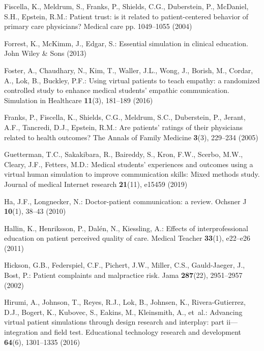 \documentclass[runningheads]{llncs}
\begin{document}
\begin{thebibliography}{10}
Fiscella, K., Meldrum, S., Franks, P., Shields, C.G., Duberstein, P., McDaniel,
  S.H., Epstein, R.M.: Patient trust: is it related to patient-centered
  behavior of primary care physicians? Medical care pp. 1049--1055 (2004)

Forrest, K., McKimm, J., Edgar, S.: Essential simulation in clinical education.
  John Wiley \& Sons (2013)

Foster, A., Chaudhary, N., Kim, T., Waller, J.L., Wong, J., Borish, M., Cordar,
  A., Lok, B., Buckley, P.F.: Using virtual patients to teach empathy: a
  randomized controlled study to enhance medical students’ empathic
  communication. Simulation in Healthcare  \textbf{11}(3),  181--189 (2016)

Franks, P., Fiscella, K., Shields, C.G., Meldrum, S.C., Duberstein, P., Jerant,
  A.F., Tancredi, D.J., Epstein, R.M.: Are patients’ ratings of their
  physicians related to health outcomes? The Annals of Family Medicine
  \textbf{3}(3),  229--234 (2005)

Guetterman, T.C., Sakakibara, R., Baireddy, S., Kron, F.W., Scerbo, M.W.,
  Cleary, J.F., Fetters, M.D.: Medical students’ experiences and outcomes
  using a virtual human simulation to improve communication skills: Mixed
  methods study. Journal of medical Internet research  \textbf{21}(11),  e15459
  (2019)

Ha, J.F., Longnecker, N.: {{D}octor-patient communication: a review}. Ochsner J
   \textbf{10}(1),  38--43 (2010)

Hallin, K., Henriksson, P., Dal{\'e}n, N., Kiessling, A.: Effects of
  interprofessional education on patient perceived quality of care. Medical
  Teacher  \textbf{33}(1),  e22--e26 (2011)

Hickson, G.B., Federspiel, C.F., Pichert, J.W., Miller, C.S., Gauld-Jaeger, J.,
  Bost, P.: Patient complaints and malpractice risk. Jama  \textbf{287}(22),
  2951--2957 (2002)

Hirumi, A., Johnson, T., Reyes, R.J., Lok, B., Johnsen, K., Rivera-Gutierrez,
  D.J., Bogert, K., Kubovec, S., Eakins, M., Kleinsmith, A., et~al.: Advancing
  virtual patient simulations through design research and interplay: part
  ii—integration and field test. Educational technology research and
  development  \textbf{64}(6),  1301--1335 (2016)


\end{thebibliography}
\end{document}
